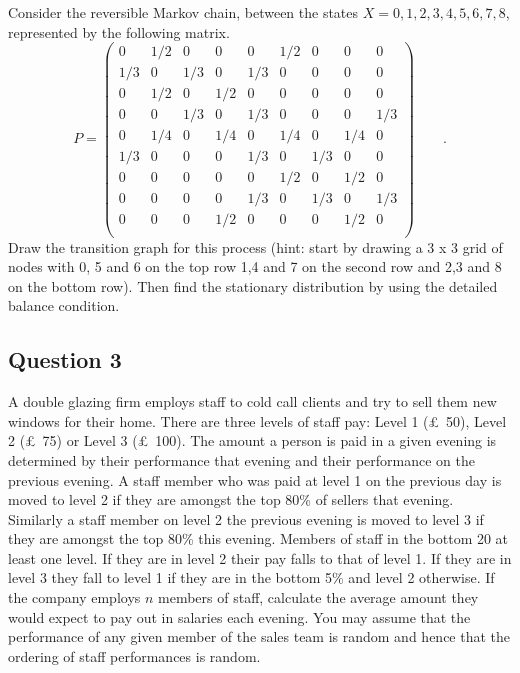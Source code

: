 \documentclass[a4paper]{article}
\begin{document}
Consider the  reversible  Markov chain, between the
states $X=0,1,2,3,4,5,6,7,8$,  represented  by  the following matrix.
$$
P=
\left(
\begin{matrix}
 0 & 1/2 & 0 & 0& 0 & 1/2 & 0 & 0 & 0 \\
 1/3 & 0 & 1/3 & 0 & 1/3 & 0 & 0 & 0 & 0 \\
 0 & 1/2 & 0 & 1/2 & 0 & 0 & 0 & 0 & 0 \\
 0 & 0 & 1/3 & 0 & 1/3 & 0 & 0 & 0 & 1/3\\
 0 & 1/4 & 0 & 1/4 & 0 & 1/4 & 0 & 1/4 & 0\\
 1/3 & 0 & 0 & 0 & 1/3 & 0 &  1/3 & 0 & 0 \\
 0 & 0 & 0 & 0 & 0 & 1/2 & 0 & 1/2 & 0 \\
 0 & 0 & 0 & 0 & 1/3 & 0 & 1/3 & 0 & 1/3\\
 0 & 0 & 0 & 1/2 & 0 & 0 & 0 & 1/2 & 0   \\
\end{matrix}
\right) \qquad .
$$
Draw the transition graph for this process (hint: start by drawing a 3 x 3 grid
of nodes with 0, 5 and 6 on the top row 1,4 and 7 on the second row and 2,3 and
8 on the bottom row).  Then find the stationary distribution by using the detailed
balance condition.

\subsection{Question 3}

A double glazing firm employs staff to cold call clients and try to sell
them new windows for their home. There are three levels of staff pay: Level 1
(\pounds~50), Level 2 (\pounds~75) or Level 3 (\pounds~100).  The amount a
person is paid in a given evening is determined by their performance
that evening and their performance on the previous evening.  A staff member who
was paid at level 1 on the previous day is moved to level 2 if they are
amongst the top 80\% of sellers that evening. Similarly a staff member on level
2 the previous evening is moved to level 3 if they are amongst the top 80\% this evening. Members of staff in the bottom 20%
at least one level.  If they are in level 2 their pay falls to that of
level 1.  If they are in level 3 they fall to level 1 if they are in the bottom
5\% and level 2 otherwise. If the company employs
$n$ members of staff, calculate the average amount they would expect to pay out
in salaries each evening.  You may assume that the performance of any given
member of the sales team is random and hence that the ordering of
staff performances is random.
\end{document}
